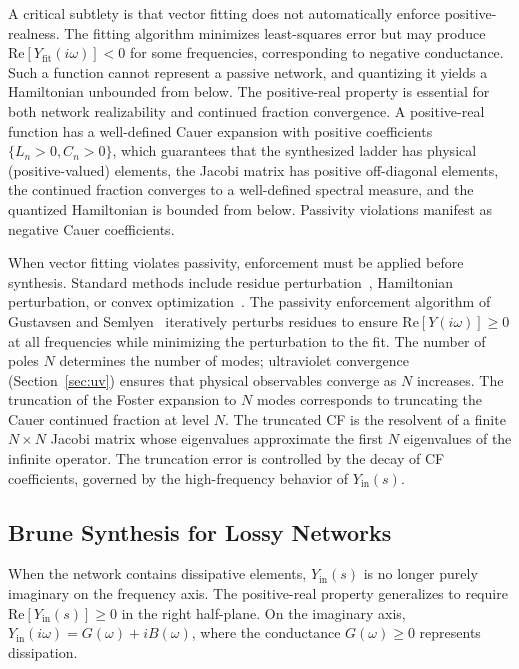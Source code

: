 \documentclass[reprint, floatfix, superscriptaddress, amsmath, amssymb, longbibliography]{revtex4-2}
\begin{document}
A critical subtlety is that vector fitting does not automatically enforce positive-realness. The fitting algorithm minimizes least-squares error but may produce $\mathrm{Re}[Y_{\mathrm{fit}}(i\omega)] < 0$ for some frequencies, corresponding to negative conductance. Such a function cannot represent a passive network, and quantizing it yields a Hamiltonian unbounded from below. The positive-real property is essential for both network realizability and continued fraction convergence. A positive-real function has a well-defined Cauer expansion with positive coefficients $\{L_n > 0, C_n > 0\}$, which guarantees that the synthesized ladder has physical (positive-valued) elements, the Jacobi matrix has positive off-diagonal elements, the continued fraction converges to a well-defined spectral measure, and the quantized Hamiltonian is bounded from below. Passivity violations manifest as negative Cauer coefficients.

When vector fitting violates passivity, enforcement must be applied before synthesis. Standard methods include residue perturbation~\cite{Gustavsen2001}, Hamiltonian perturbation, or convex optimization~\cite{GrivetTalocia2016}. The passivity enforcement algorithm of Gustavsen and Semlyen~\cite{Gustavsen2001} iteratively perturbs residues to ensure $\mathrm{Re}[Y(i\omega)] \geq 0$ at all frequencies while minimizing the perturbation to the fit. The number of poles $N$ determines the number of modes; ultraviolet convergence (Section~\ref{sec:uv}) ensures that physical observables converge as $N$ increases. The truncation of the Foster expansion to $N$ modes corresponds to truncating the Cauer continued fraction at level $N$. The truncated CF is the resolvent of a finite $N \times N$ Jacobi matrix whose eigenvalues approximate the first $N$ eigenvalues of the infinite operator. The truncation error is controlled by the decay of CF coefficients, governed by the high-frequency behavior of $Y_{\mathrm{in}}(s)$.

\subsection{Brune Synthesis for Lossy Networks}
\label{sec:brune_synthesis}

When the network contains dissipative elements, $Y_{\mathrm{in}}(s)$ is no longer purely imaginary on the frequency axis. The positive-real property generalizes to require $\mathrm{Re}[Y_{\mathrm{in}}(s)] \geq 0$ in the right half-plane. On the imaginary axis, $Y_{\mathrm{in}}(i\omega) = G(\omega) + iB(\omega)$, where the conductance $G(\omega) \geq 0$ represents dissipation.
\end{document}
